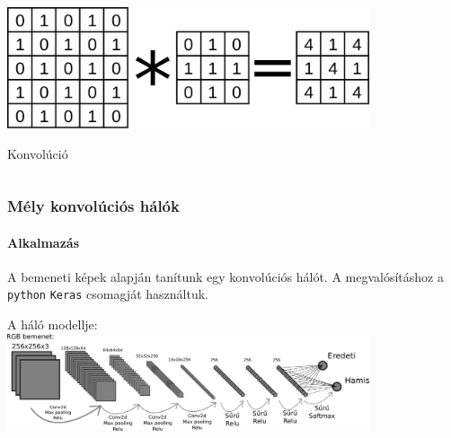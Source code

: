 \documentclass[11pt]{beamer}
\begin{document}
\begin{frame}
\begin{columns}
\begin{column}{.5\textwidth}
			
			\includegraphics[width=0.8\textwidth]{konv-pelda.pdf}
			
			\centering
			Konvolúció
			
		\end{column}				
	\end{columns}
	

\end{frame}


\begin{frame}
	\frametitle{Mély konvolúciós hálók}
	\framesubtitle{Alkalmazás}
	
	A bemeneti képek alapján tanítunk egy konvolúciós hálót. A megvalósításhoz a \texttt{python} \texttt{Keras} csomagját használtuk.	
	
	A háló modellje:
	\includegraphics[width=0.8\textwidth, center]{predictor-network-modell.pdf}
	
	
	

%			
	
	

\end{frame}
\end{document}
